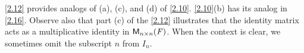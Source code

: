 \begin{note}
  \cref{2.12} provides analogs of (a), (c), and (d) of \cref{2.10}.
  \cref{2.10}(b) has its analog in \cref{2.16}.
  Observe also that part (c) of the \cref{2.12} illustrates that the identity matrix acts as a multiplicative identity in \(\mathsf{M}_{{n} \times n}({\mathit{F}})\).
  When the context is clear, we sometimes omit the subscript \(n\) from \(I_n\).
\end{note}

\begin{thm}\label{2.16}

\end{thm}
